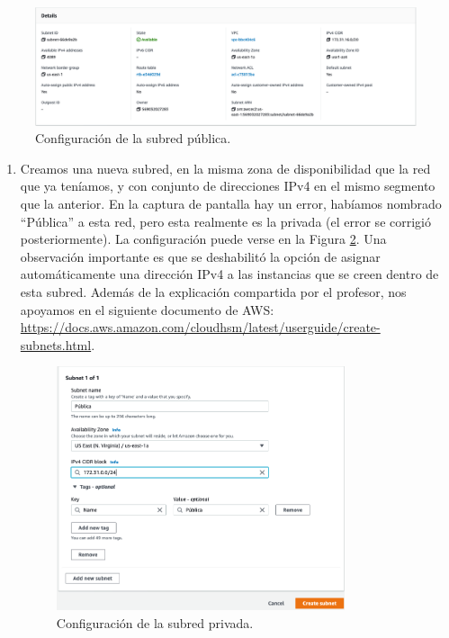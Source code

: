 \documentclass{article}
\begin{document}
\begin{figure}[H]
  \centering
  \includegraphics[width=\textwidth]{SSNAT/publicSubnet}
  \caption{Configuraci\'on de la subred p\'ublica.}
  \label{fig:NAT-pubSubnet}
\end{figure}

\begin{enumerate}
  \item Creamos una nueva subred, en la misma zona de
    disponibilidad que la red que ya ten\'iamos, y con
    conjunto de direcciones IPv4 en el mismo segmento
    que la anterior.   En la captura de pantalla hay un
    error, hab\'iamos nombrado ``P\'ublica'' a esta red,
    pero esta realmente es la privada (el error se
    corrigi\'o posteriormente).    La configuraci\'on
    puede verse en la Figura \ref{fig:NAT-priSubnet}. Una
    observaci\'on importante es que se deshabilit\'o
    la opci\'on de asignar autom\'aticamente una
    direcci\'on IPv4 a las instancias que se creen
    dentro de esta subred.   Adem\'as de la explicaci\'on
    compartida por el profesor, nos apoyamos en el
    siguiente documento de AWS: \href{https://docs.aws.amazon.com/cloudhsm/latest/userguide/create-subnets.html}{https://docs.aws.amazon.com/cloudhsm/latest/userguide/create-subnets.html}.
    \begin{figure}[H]
      \centering
      \includegraphics[width=0.8\textwidth]{SSNAT/privateSubnet}
      \caption{Configuraci\'on de la subred privada.}
      \label{fig:NAT-priSubnet}
    \end{figure}


\end{enumerate}
\end{document}
